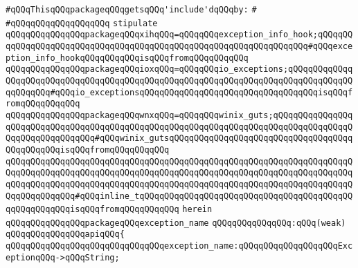 \newline
\newline
\verb|#qQQqThisqQQqpackageqQQqgetsqQQq'include'dqQQqby:|\newline
\verb|#|\newline
\verb|#qQQqqQQqqQQqqQQqqQQq|\newline
\newline
\verb|stipulate|\newline
\verb|qQQqqQQqqQQqqQQqpackageqQQqxihqQQq=qQQqqQQqexception_info_hook;qQQqqQQqqQQqqQQqqQQqqQQqqQQqqQQqqQQqqQQqqQQqqQQqqQQqqQQqqQQqqQQqqQQq#qQQqexception_info_hookqQQqqQQqqQQqisqQQqfromqQQqqQQqqQQq|\newline
\verb|qQQqqQQqqQQqqQQqpackageqQQqioxqQQq=qQQqqQQqio_exceptions;qQQqqQQqqQQqqQQqqQQqqQQqqQQqqQQqqQQqqQQqqQQqqQQqqQQqqQQqqQQqqQQqqQQqqQQqqQQqqQQqqQQqqQQqqQQq#qQQqio_exceptionsqQQqqQQqqQQqqQQqqQQqqQQqqQQqqQQqqQQqisqQQqfromqQQqqQQqqQQq|\newline
\verb|qQQqqQQqqQQqqQQqpackageqQQqwnxqQQq=qQQqqQQqwinix_guts;qQQqqQQqqQQqqQQqqQQqqQQqqQQqqQQqqQQqqQQqqQQqqQQqqQQqqQQqqQQqqQQqqQQqqQQqqQQqqQQqqQQqqQQqqQQqqQQqqQQqqQQq#qQQqwinix_gutsqQQqqQQqqQQqqQQqqQQqqQQqqQQqqQQqqQQqqQQqqQQqqQQqisqQQqfromqQQqqQQqqQQq|\newline
\verb|qQQqqQQqqQQqqQQqqQQqqQQqqQQqqQQqqQQqqQQqqQQqqQQqqQQqqQQqqQQqqQQqqQQqqQQqqQQqqQQqqQQqqQQqqQQqqQQqqQQqqQQqqQQqqQQqqQQqqQQqqQQqqQQqqQQqqQQqqQQqqQQqqQQqqQQqqQQqqQQqqQQqqQQqqQQqqQQqqQQqqQQqqQQqqQQqqQQqqQQqqQQqqQQqqQQqqQQqqQQqqQQq#qQQqinline_tqQQqqQQqqQQqqQQqqQQqqQQqqQQqqQQqqQQqqQQqqQQqqQQqqQQqqQQqisqQQqfromqQQqqQQqqQQq|\newline
\verb|herein|\newline
\newline
\verb|qQQqqQQqqQQqqQQqpackageqQQqexception_name|\newline
\verb|qQQqqQQqqQQqqQQq:qQQq(weak)|\newline
\verb|qQQqqQQqqQQqqQQqapiqQQq{|\newline
\verb|qQQqqQQqqQQqqQQqqQQqqQQqqQQqqQQqexception_name:qQQqqQQqqQQqqQQqqQQqExceptionqQQq->qQQqString;|\newline
